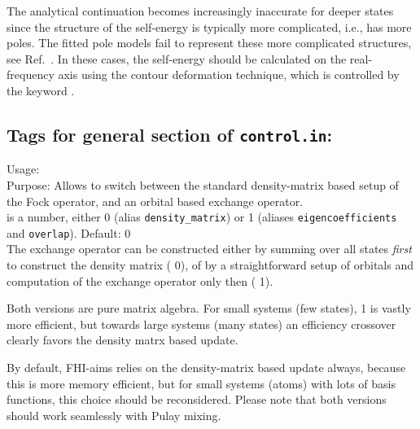 The analytical continuation becomes increasingly inaccurate for 
deeper states since the structure of the self-energy is typically more
complicated, i.e., has more poles. The fitted pole models fail to
represent these more complicated structures, see Ref.~\cite{Golze2018}.
In these cases, the self-energy should be calculated on the real-frequency
axis using the contour deformation technique, which is controlled by
 the keyword . 



\subsection*{Tags for general section of \texttt{control.in}:}

{ \noindent
  Usage:   \\[1.0ex]
  Purpose: Allows to switch between the standard density-matrix based
    setup of the Fock operator, and an orbital based exchange
    operator. \\[1.0ex]
   is a number, either 0 (alias \texttt{density\_matrix}) or
  1 (aliases \texttt{eigencoefficients} and \texttt{overlap}). Default: 0 \\
}
The exchange operator can be constructed either by summing over all
states \emph{first} to construct the density matrix (
0), of by a straightforward setup of orbitals and computation of the
exchange operator only then ( 1).

Both versions are pure matrix algebra. For small systems (few states),
 1 is vastly more efficient, but towards large systems
(many states) an efficiency crossover clearly favors the density matrx
based update.

By default, FHI-aims relies on the density-matrix based update always, because
this is more memory efficient, but for small systems (atoms) with lots of
basis functions, this choice should be reconsidered.  Please note that both
versions should work seamlessly with Pulay mixing.

